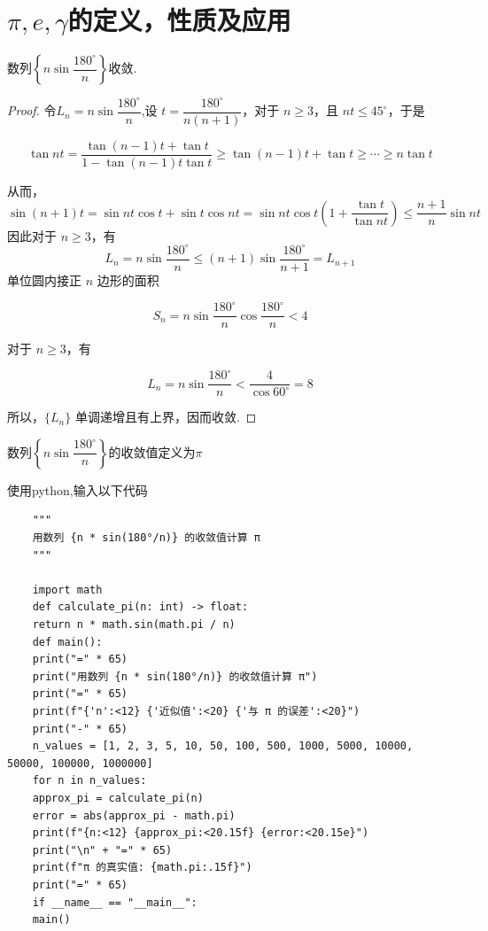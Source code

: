 \section{$\pi,e,\gamma$的定义，性质及应用}
\begin{proposition}
	数列$\left\{n\sin\dfrac{180^\circ}{n}\right\}$收敛.
\end{proposition}
\begin{proof}
	
	令$L_n=n\sin\dfrac{180^\circ}{n}$,设 $t = \dfrac{180^\circ}{n(n+1)}$，对于 $n \geqslant 3$，且 $nt \leqslant 45^\circ$，于是
	
	\[
	\tan nt = \frac{\tan(n-1)t + \tan t}{1 - \tan(n-1)t \tan t}\geqslant\tan(n-1)t + \tan t\geqslant\cdots
	\geqslant n\tan t
	\]
	
	从而，
	\[\sin(n+1)t = \sin nt \cos t + \sin t \cos nt = \sin nt \cos t \left(1 + \frac{\tan t}{\tan nt}\right) \leqslant \frac{n+1}{n} \sin nt\]
	因此对于 $n \geqslant 3$，有
	\[
	L_n = n \sin \frac{180^\circ}{n} \leqslant (n+1) \sin \frac{180^\circ}{n+1} = L_{n+1}
	\]
	单位圆内接正 $n$ 边形的面积
	
	\[
	S_n = n \sin \frac{180^\circ}{n} \cos \frac{180^\circ}{n} < 4
	\]
	
	对于 $n \geqslant 3$，有
	
	\[
	L_n = n \sin \frac{180^\circ}{n} < \frac{4}{\cos 60^\circ} = 8
	\]
	
	所以，$\{L_n\}$ 单调递增且有上界，因而收敛.
	
\end{proof}
\begin{definition}
	数列$\left\{n\sin\dfrac{180^\circ}{n}\right\}$的收敛值定义为$\pi$
\end{definition}
使用python,输入以下代码
\begin{verbatim}
	"""
	用数列 {n * sin(180°/n)} 的收敛值计算 π
	"""
	
	import math
	def calculate_pi(n: int) -> float:
	return n * math.sin(math.pi / n)
	def main():
	print("=" * 65)
	print("用数列 {n * sin(180°/n)} 的收敛值计算 π")
	print("=" * 65)
	print(f"{'n':<12} {'近似值':<20} {'与 π 的误差':<20}")
	print("-" * 65)
	n_values = [1, 2, 3, 5, 10, 50, 100, 500, 1000, 5000, 10000, 50000, 100000, 1000000]
	for n in n_values:
	approx_pi = calculate_pi(n)
	error = abs(approx_pi - math.pi)
	print(f"{n:<12} {approx_pi:<20.15f} {error:<20.15e}")
	print("\n" + "=" * 65)
	print(f"π 的真实值: {math.pi:.15f}")
	print("=" * 65)
	if __name__ == "__main__":
	main()
\end{verbatim}
